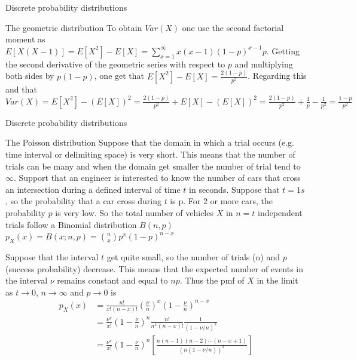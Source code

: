 \documentclass[8pt]{beamer}
\renewcommand{\emph}[1]{\textcolor{myorange}{#1}}
\begin{document}
\begin{frame}{Discrete probability distributions}
    \begin{block}{The \alert{geometric} distribution}
        To obtain $Var (X)$ one use the second factorial moment as $E[X(X-1)] = E[X^2] - E[X] = \sum_{x=1}^\infty x(x-1) (1-p)^{x-1} p$. Getting the second derivative of the \emph{geometric series} with respect to $p$ and multiplying both sides by $p(1-p)$, one get that $E[X^2] - E[X] = \frac{2(1-p)}{p^2}$. Regarding this and that $Var (X) = E[X^2] - \left(E[X]\right)^2 = \frac{2(1-p)}{p^2}+ E[X]-\left(E[X]\right)^2 = \frac{2(1-p)}{p^2} + \frac{1}{p}- \frac{1}{p^2} = \frac{1-p}{p^2}$ 
    \end{block}
\end{frame}

\begin{frame}{Discrete probability distributions}
    \begin{block}{The \alert{Poisson} distribution}
        Suppose that the domain in which a trial occurs (e.g. time interval or delimiting space) is very short. This means that the number of trials can be many and when the domain get smaller the number of trial tend to $\infty$. Support that an engineer is interested to know the number of cars that cross an intersection during a defined interval of time $t$ in seconds. Suppose that $t=1s$, so the probability that a car cross during $t$ is p. For 2 or more cars, the probability $p$ is very low. So the total number of vehicles $X$ in $n=t$ independent trials follow a \emph{Binomial distribution $B(n,p)$} $p_X (x) = B(x;n,p) = \binom{n}{x} p^x (1-p)^{n-x}$

        Suppose that the interval $t$ get quite small, so the \emph{number of trials (n)} and $p$ (success probability) decrease. This means that the expected number of events in the interval $\nu$ remains constant and equal to $np$. Thus the \emph{pmf} of $X$ in the limit  as $t\rightarrow 0$,  $n\rightarrow \infty$ and $p\rightarrow 0$ is
        \begin{align*}
            p_X (x) &= \frac{n!}{x! (n-x)!} \left(\frac{\nu}{n}\right)^x \left(1-\frac{\nu}{n}\right)^{n-x}\\
                    &= \frac{\nu^x}{x!} \left(1-\frac{\nu}{n}\right)^{n}\frac{n!}{n^x (n-x)!} \frac{1}{\left(1-\nu/n\right)^x} \\
                    &= \frac{\nu^x}{x!} \left(1-\frac{\nu}{n}\right)^n \left[ \frac{n (n-1) (n-2) \cdots (n-x+1)}{\left( n(1-\nu/n) \right)^x } \right] 
        \end{align*}

    \end{block}
\end{frame}
\end{document}
